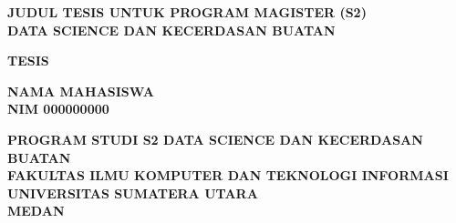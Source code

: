 \clearpage
\thispagestyle{empty}
\begin{center}
\vspace*{60mm minus 10mm}

{\fontsize{14}{18}\selectfont\bfseries JUDUL TESIS UNTUK PROGRAM MAGISTER (S2)\\
DATA SCIENCE DAN KECERDASAN BUATAN\par}

\vspace{20mm}

{\fontsize{14}{18}\selectfont\bfseries TESIS\par}

\vspace{20mm}

{\fontsize{14}{18}\selectfont\bfseries NAMA MAHASISWA\\
NIM 000000000\par}

\vfill

\ThesisLogo

\vfill

{\fontsize{14}{18}\selectfont\bfseries
PROGRAM STUDI S2 DATA SCIENCE DAN KECERDASAN BUATAN\\
FAKULTAS ILMU KOMPUTER DAN TEKNOLOGI INFORMASI\\
UNIVERSITAS SUMATERA UTARA\\
MEDAN\\
\the\year\par}

\vspace*{60mm minus 10mm}
\end{center}
\restoregeometry
\clearpage
